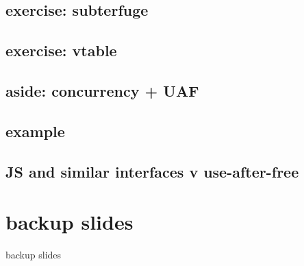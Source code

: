 \subsection{exercise: subterfuge}


\subsection{exercise: vtable}


\subsection{aside: concurrency + UAF}


\subsection{example}


\subsection{JS and similar interfaces v use-after-free}






\section{backup slides}
\begin{frame}{backup slides}
\end{frame}



